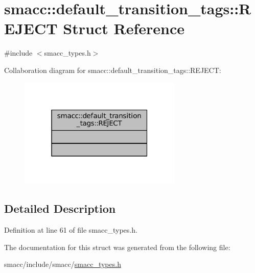 \hypertarget{structsmacc_1_1default__transition__tags_1_1REJECT}{}\section{smacc\+:\+:default\+\_\+transition\+\_\+tags\+:\+:R\+E\+J\+E\+CT Struct Reference}
\label{structsmacc_1_1default__transition__tags_1_1REJECT}


{\ttfamily \#include $<$smacc\+\_\+types.\+h$>$}



Collaboration diagram for smacc\+:\+:default\+\_\+transition\+\_\+tags\+:\+:R\+E\+J\+E\+CT\+:
\nopagebreak
\begin{figure}[H]
\begin{center}
\leavevmode
\includegraphics[width=220pt]{structsmacc_1_1default__transition__tags_1_1REJECT__coll__graph}
\end{center}
\end{figure}


\subsection{Detailed Description}


Definition at line 61 of file smacc\+\_\+types.\+h.



The documentation for this struct was generated from the following file\+:\begin{DoxyCompactItemize}
\item 
smacc/include/smacc/\hyperlink{smacc__types_8h}{smacc\+\_\+types.\+h}\end{DoxyCompactItemize}
